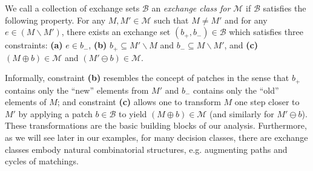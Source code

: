 \documentclass{article}
\newcommand{\wei}[1]{}
\newcommand{\wei}[1]{{\color{blue!50!black}  [\text{Wei:} #1]}}
\newcommand{\M}{\mathcal M}
\newcommand{\B}{\mathcal B}
\newcommand{\del}{\backslash}
\begin{document}
We call a collection of exchange sets $\B$ an \emph{exchange class for $\M$} if $\B$ satisfies the following property.
For any $M,M'\in \M$ such that $M\not = M'$  and for any $e\in (M\del M')$, there exists an exchange set $(b_+,b_-)\in \B$ which satisfies three constraints: \textbf{(a)} $e\in b_-$, \textbf{(b)} $b_+ \subseteq M'\del M$ and $b_- \subseteq M \del M'$, and \textbf{(c)} $(M\oplus b) \in \M$ and $(M'\ominus b) \in \M$.

Informally, constraint \textbf{(b)} resembles the concept of patches in the sense that $b_+$ contains only the ``new'' elements from $M'$ and $b_-$ contains only the ``old'' elements of $M$; and constraint \textbf{(c)} allows one to transform $M$ one step closer to $M'$ by applying  a patch $b\in \B$ to yield $(M\oplus b) \in \M$ (and similarly for $M'\ominus b$).
These transformations are the basic building blocks of our analysis.
Furthermore, as we will see later in our examples, for many decision classes, there are exchange classes embody natural combinatorial structures, e.g. augmenting paths and cycles of matchings.
\end{document}
